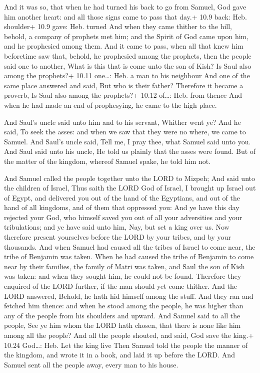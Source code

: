  And it was so, that when he had turned his back to go
from Samuel, God gave him another heart: and all those signs came to
pass that day.+ 10.9 back: Heb. shoulder+ 10.9 gave: Heb. turned
 And when they came thither to the hill, behold, a company
of prophets met him; and the Spirit of God came upon him, and he
prophesied among them.  And it came to pass, when all that
knew him beforetime saw that, behold, he prophesied among the prophets,
then the people said one to another, What is this that is come unto the
son of Kish? Is Saul also among the prophets?+ 10.11 one\ldots: Heb. a
man to his neighbour  And one of the same place answered
and said, But who is their father? Therefore it became a proverb, Is
Saul also among the prophets?+ 10.12 of\ldots: Heb. from thence
 And when he had made an end of prophesying, he came to the
high place.

 And Saul's uncle said unto him and to his servant,
Whither went ye? And he said, To seek the asses: and when we saw that
they were no where, we came to Samuel.  And Saul's uncle
said, Tell me, I pray thee, what Samuel said unto you.  And
Saul said unto his uncle, He told us plainly that the asses were found.
But of the matter of the kingdom, whereof Samuel spake, he told him not.

 And Samuel called the people together unto the LORD to
Mizpeh;  And said unto the children of Israel, Thus saith
the LORD God of Israel, I brought up Israel out of Egypt, and delivered
you out of the hand of the Egyptians, and out of the hand of all
kingdoms, and of them that oppressed you:  And ye have this
day rejected your God, who himself saved you out of all your adversities
and your tribulations; and ye have said unto him, Nay, but set a king
over us. Now therefore present yourselves before the LORD by your
tribes, and by your thousands.  And when Samuel had caused
all the tribes of Israel to come near, the tribe of Benjamin was taken.
 When he had caused the tribe of Benjamin to come near by
their families, the family of Matri was taken, and Saul the son of Kish
was taken: and when they sought him, he could not be found.
 Therefore they enquired of the LORD further, if the man
should yet come thither. And the LORD answered, Behold, he hath hid
himself among the stuff.  And they ran and fetched him
thence: and when he stood among the people, he was higher than any of
the people from his shoulders and upward.  And Samuel said
to all the people, See ye him whom the LORD hath chosen, that there is
none like him among all the people? And all the people shouted, and
said, God save the king.+ 10.24 God\ldots: Heb. Let the king live
 Then Samuel told the people the manner of the kingdom, and
wrote it in a book, and laid it up before the LORD. And Samuel sent all
the people away, every man to his house.

